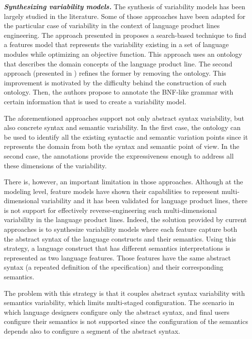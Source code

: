 \vspace{2mm}
\textbf{\textit{Synthesizing variability models.}} The synthesis of variability models has been largely studied in the literature. Some of those approaches have been adapted for the particular case of variability in the context of language product lines engineering. The approach presented in \cite{Vacchi:2014} proposes a search-based technique to find a features model that represents the variability existing in a set of language modules while optimizing an objective function. This approach uses an ontology that describes the domain concepts of the language product line. The second approach (presented in \cite{Kuhn:2015}) refines the former by removing the ontology. This improvement is motivated by the difficulty behind the construction of such ontology. Then, the authors propose to annotate the BNF-like grammar with certain information that is used to create a variability model. 

The aforementioned approaches support not only abstract syntax variability, but also concrete syntax and semantic variability. In the first case, the ontology can be used to identify all the existing syntactic and semantic variation points since it represents the domain from both the syntax and semantic point of view. In the second case, the annotations provide the expressiveness enough to address all these dimensions of the variability.  

There is, however, an important limitation in those approaches. Although at the modeling level, feature models have shown their capabilities to represent multi-dimensional variability and it has been validated for language product lines, there is not support for effectively reverse-engineering such multi-dimensional variability in the language product lines. Indeed, the solution provided by current approaches is to synthesize variability models where each feature capture both the abstract syntax of the language constructs and their semantics. Using this strategy, a language construct that has different semantics interpretations is represented as two language features. Those features have the same abstract syntax (a repeated definition of the specification) and their corresponding semantics. 

The problem with this strategy is that it couples abstract syntax variability with semantics variability, which limits multi-staged configuration. The scenario in which language designers configure only the abstract syntax, and final users configure their semantics is not supported since the configuration of the semantics depends also to configure a segment of the abstract syntax. 

